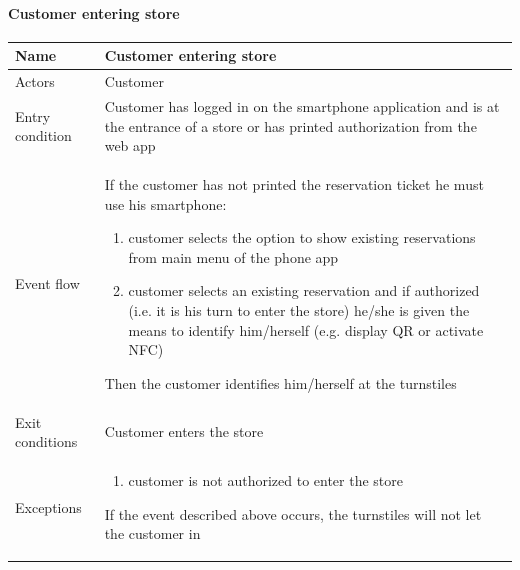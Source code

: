 \paragraph{Customer entering store}
\begin{flushleft}
	\begin{tabular} { | m{3cm} | m{10cm} | }
		\hline
		Name & Customer entering store\\
		\hline
		Actors & Customer\\
		\hline
		Entry condition & Customer has logged in on the smartphone application and is at the entrance of a store or has printed authorization from the web app\\
		\hline
		Event flow &
		If the customer has not printed the reservation ticket he must use his smartphone:
		\begin{enumerate}
			\item customer selects the option to show existing reservations from main menu of the phone app 
			\item customer selects an existing reservation and if authorized (i.e. it is his turn to enter the store) he/she is given the means to identify him/herself (e.g. display QR or activate NFC)
		\end{enumerate}
		Then the customer identifies him/herself at the turnstiles\\
		\hline
		Exit conditions & Customer enters the store\\
		\hline
		Exceptions & \begin{enumerate}
			\item customer is not authorized to enter the store
		\end{enumerate}
		If the event described above occurs, the turnstiles will not let the customer in\\
		\hline
	\end{tabular}
\end{flushleft}

